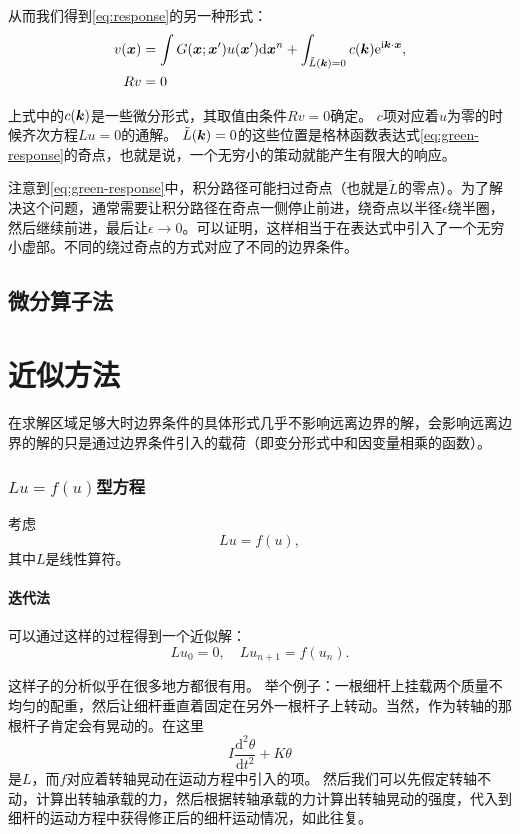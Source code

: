 \documentclass[UTF8, a4paper]{ctexart}
\newcommand*{\ii}{\mathrm{i}}
\newcommand*{\ee}{\mathrm{e}}
\begin{document}
从而我们得到\eqref{eq:response}的另一种形式：
\begin{equation}
    \begin{aligned}
        v(\vb*{x}) &= \int G(\vb*{x};\vb*{x}') u(\vb*{x}') \dd \vb*{x}^n 
        + \int_{\tilde{L}(\vb*{k})=0} c(\vb*{k}) \ee^{\ii \vb*{k} \cdot \vb*{x}}, \\
        R v &= 0
    \end{aligned}
\end{equation}

上式中的$c(\vb*{k})$是一些微分形式，其取值由条件$Rv=0$确定。
$c$项对应着$u$为零的时候齐次方程$Lu=0$的通解。
$\tilde{L}(\vb*{k})=0$的这些位置是格林函数表达式\eqref{eq:green-response}的奇点，也就是说，一个无穷小的策动就能产生有限大的响应。

注意到\eqref{eq:green-response}中，积分路径可能扫过奇点（也就是$\tilde{L}$的零点）。为了解决这个问题，通常需要让积分路径在奇点一侧停止前进，绕奇点以半径$\epsilon$绕半圈，然后继续前进，最后让$\epsilon \to 0$。可以证明，这样相当于在表达式中引入了一个无穷小虚部。不同的绕过奇点的方式对应了不同的边界条件。

\subsection{微分算子法}

\section{近似方法}

在求解区域足够大时边界条件的具体形式几乎不影响远离边界的解，会影响远离边界的解的只是通过边界条件引入的载荷（即变分形式中和因变量相乘的函数）。

\subsubsection{$Lu=f(u)$型方程}
考虑
\[
    Lu = f(u),
\]
其中$L$是线性算符。

\paragraph{迭代法}可以通过这样的过程得到一个近似解：
\begin{equation}
    Lu_0 = 0, \quad Lu_{n+1} = f(u_n).
\end{equation}

这样子的分析似乎在很多地方都很有用。
举个例子：一根细杆上挂载两个质量不均匀的配重，然后让细杆垂直着固定在另外一根杆子上转动。当然，作为转轴的那根杆子肯定会有晃动的。在这里
\[
    I\frac{\mathrm{d}^2\theta}{\mathrm{d}t^2} + K \theta 
\]
是$L$，而$f$对应着转轴晃动在运动方程中引入的项。
然后我们可以先假定转轴不动，计算出转轴承载的力，然后根据转轴承载的力计算出转轴晃动的强度，代入到细杆的运动方程中获得修正后的细杆运动情况，如此往复。
\end{document}
